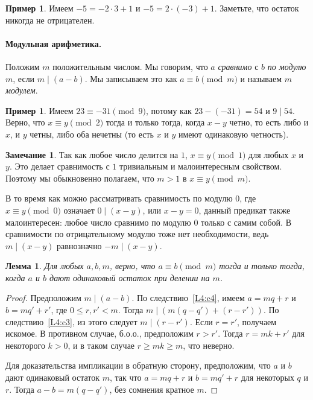 \documentclass[12pt,notitlepage]{article}
\theoremstyle{plain}
\newtheorem{lemma}[thm]{Лемма}
\theoremstyle{definition}
\newtheorem{exm}[thm]{Пример}
\newtheorem{rem}[thm]{Замечание}
\theoremstyle{plain}
\newcommand{\1}{\mathbf{1}}
\newcommand{\0}{\mathbf{0}}
\newcommand{\dvd}{\mathop{\mid}}
\newcommand{\mcomm}[1]{}
\begin{document}
\begin{exm}
	Имеем $-5 = -2 \cdot 3 + 1$ и $-5 = 2 \cdot (-3) + 1$. Заметьте, что остаток никогда не отрицателен.
\end{exm}

\paragraph{Модульная арифметика.}

Положим $m$ положительным числом. Мы говорим, что $a$ \emph{сравнимо} с $b$ \emph{по модулю} $m$, если $m \dvd (a - b)$.  Мы записываем это как $a \equiv b \pmod m$ и называем $m$ \emph{модулем}.

\begin{exm}
	Имеем $23 \equiv -31 \pmod 9$, потому как $23 - (-31) = 54$ и $9 \dvd 54$. Верно, что $x \equiv y \pmod 2$ тогда и только тогда, когда $x - y$ четно, то есть либо и $x$, и $y$ четны, либо оба нечетны (то есть $x$ и $y$ имеют одинаковую четность).
\end{exm}

\begin{rem}
	Так как любое число делится на $1$, $x \equiv y \pmod 1$ для любых $x$ и $y$. Это делает сравнимость с $1$ тривиальным и малоинтересным свойством. Поэтому мы обыкновенно полагаем, что $m > 1$ в $x \equiv y \pmod m$.
	
	В то время как можно рассматривать сравнимость по модулю $0$, где $x \equiv y \pmod 0$ означает $0 \dvd (x - y)$, или $x - y = 0$, данный предикат также малоинтересен: любое число сравнимо по модулю $0$ только с самим собой. В сравнимости по отрицательному модулю тоже нет необходимости, ведь $m \dvd (x - y)$ равнозначно $-m \dvd (x - y)$.
\end{rem}

\mcomm{In practice, we also used simplified notation $a \equiv b\ (m)$ as well. Many students are already familiar with this concept but prefer to define it in terms of remainders. The Instructor should underline that each of these two equivalent definitions may be preferable to the other one in various situations.}

\begin{lemma}\label{L4:l5}
	Для любых $a, b, m$, верно, что $a \equiv b \pmod m$ тогда и только тогда, когда $a$ и $b$ дают одинаковый остаток при делении на $m$.
\end{lemma}
\begin{proof}
	Предположим $m \dvd (a - b)$. По следствию~\ref{L4:c4}, имеем $a = m q + r$ и $b = m q' + r'$, где $0 \leq r, r' < m$. Тогда $m \dvd (m(q - q') + (r - r'))$. По следствию~\ref{L4:c3}, из этого следует $m \dvd (r - r')$. Если $r = r'$, получаем искомое. В противном случае, б.о.о., предположим $r > r'$. Тогда $r = mk + r'$ для некоторого $k > 0$, и в таком случае $r \geq mk \geq m$, что неверно.
	
	Для доказательства импликации в обратную сторону, предположим, что $a$ и $b$ дают одинаковый остаток $m$, так что $a = m q + r$ и $b = m q' + r$ для некоторых $q$ и $r$. Тогда $a - b = m(q - q')$, без сомнения кратное $m$.
\end{proof}
\end{document}
